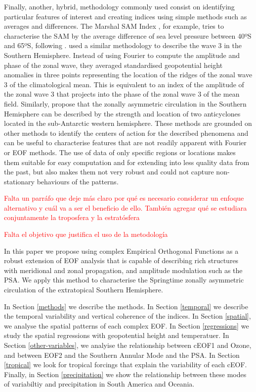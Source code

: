 \documentclass[smallextended]{svjour3}       %
\begin{document}
Finally, another, hybrid, methodology commonly used consist on identifying particular features of interest and creating indices using simple methods such as averages and differences.
The Marshal SAM Index \citep{marshall2003}, for example, tries to characterise the SAM by the average difference of sea level pressure between 40ºS and 65ºS, following \citet{gong1999}.
\citet{raphael2004} used a similar methodology to describe the wave 3 in the Southern Hemisphere.
Instead of using Fourier to compute the amplitude and phase of the zonal wave, they averaged standardised geopotential height anomalies in three points representing the location of the ridges of the zonal wave 3 of the climatological mean.
This is equivalent to an index of the amplitude of the zonal wave 3 that projects into the phase of the zonal wave 3 of the mean field.
Similarly, \citet{hobbs2010} propose that the zonally asymmetric circulation in the Southern Hemisphere can be described by the strength and location of two anticyclones located in the sub-Antarctic western hemisphere.
These methods are grounded on other methods to identify the centers of action for the described phenomena and can be useful to characterise features that are not readily apparent with Fourier or EOF methods.
The use of data of only specific regions or locations makes them suitable for easy computation and for extending into less quality data from the past, but also makes them not very robust and could not capture non-stationary behaviours of the patterns.

\textcolor{red}{Falta un parráfo que deje más claro por qué es necesario considerar un enfoque alternativo y cuál va a ser el beneficio de ello. También agregar qué se estudiara conjuntamente la troposfera y la estratósfera }

\textcolor{red}{Falta el objetivo que justifica el uso de la metodología}

In this paper we propose using complex Empirical Orthogonal Functions \citep{horel1984} as a robust extension of EOF analysis that is capable of describing rich structures with meridional and zonal propagation, and amplitude modulation such as the PSA.
We apply this method to characterise the Springtime zonally asymmetric circulation of the extratopical Southern Hemisphere.

In Section \ref{methods} we describe the methods.
In Section \ref{temporal} we describe the temporal variability and vertical coherence of the indices.
In Section \ref{spatial}, we analyse the spatial patterns of each complex EOF.
In Section \ref{regressions} we study the spatial regressions with geopotential height and temperatuer.
In Section \ref{other-variables}, we analyise the relationship between cEOF1 and Ozone, and between EOF2 and the Southern Annular Mode and the PSA.
In Section \ref{tropical} we look for tropical forcings that explain the variability of each cEOF.
Finally, in Section \ref{precipitation} we show the relationship between these modes of variabiltiy and precipitation in South America and Oceania.
\end{document}
